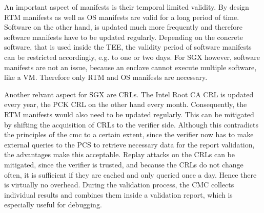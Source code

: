 An important aspect of manifests is their temporal limited validity. By design RTM manifests as well as OS manifests are valid for a long period of time. Software on the other hand, is updated much more frequently and therefore software manifests have to be updated regularly. Depending on the concrete software, that is used inside the TEE, the validity period of software manifests can be restricted accordingly, e.g. to one or two days. For SGX however, software manifests are not an issue, because an enclave cannot execute multiple software, like a VM. Therefore only RTM and OS manifests are necessary. 

Another relvant aspect for SGX are CRLs. The Intel Root CA CRL is updated every year, the PCK CRL on the other hand every month. Consequently, the RTM manifests would also need to be updated regularly. This can be mitigated by shifting the acquisition of CRLs to the verifier side. 
Although this contradicts the principles of the cmc to a certain extent, since the verifier now has to make external queries to the PCS to retrieve necessary data for the report validation, the advantages make this acceptable. Replay attacks on the CRLs can be mitigated, since the verifier is trusted, and because the CRLs do not change often, it is sufficient if they are cached and only queried once a day. Hence there is virtually no overhead.
During the validation process, the CMC collects individual results and combines them inside a validation report, which is especially useful for debugging.\\

